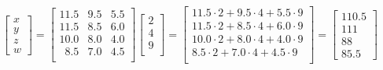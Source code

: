 \documentclass[a4paper,12pt]{article}
\begin{document}
    \vspace{0.5cm} 
    \centering
$
        \begin{bmatrix}
          x \\ y \\ z \\ w
        \end{bmatrix}
        =
        \begin{bmatrix}
            11.5 & 9.5 & 5.5\\
            11.5 & 8.5 & 6.0\\
            10.0 & 8.0 & 4.0\\
            \phantom{0}8.5 & 7.0 & 4.5\\
        \end{bmatrix}
        \begin{bmatrix}
            2 \\ 4 \\ 9\\
        \end{bmatrix}        
        = 
        \begin{bmatrix}
            11.5\cdot 2 + 9.5\cdot 4 + 5.5\cdot 9\\
            11.5\cdot 2 + 8.5\cdot 4 + 6.0\cdot 9\\
            10.0\cdot 2 + 8.0\cdot 4 + 4.0\cdot 9\\
            8.5\cdot 2 + 7.0\cdot 4 + 4.5\cdot 9\\
        \end{bmatrix}
        =
        \begin{bmatrix}
            110.5 \\ 111 \\ 88 \\85.5
        \end{bmatrix}        
$
    
\end{document}
